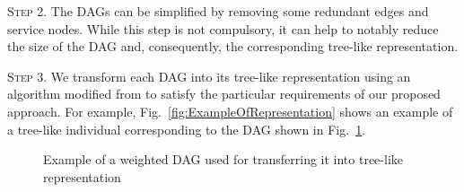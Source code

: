 \textsc{Step 2}. The DAGs can be simplified by removing some redundant edges and service nodes. 
While this step is not compulsory, it can help to notably reduce the size of the DAG and, consequently, the corresponding tree-like representation. 

\textsc{Step 3}. 
We transform each DAG into its tree-like representation using an algorithm modified from \cite{da2016genetic} to satisfy the particular requirements of our proposed approach. For example, Fig.~\ref{fig:ExampleOfRepresentation} shows an example of a tree-like individual corresponding to the DAG shown in Fig.~\ref{fig:DAG}.


\begin{figure}[htb]
\centering
 \caption{Example of a weighted DAG used for transferring it into tree-like representation}
 \label{fig:DAG}
\end{figure}


